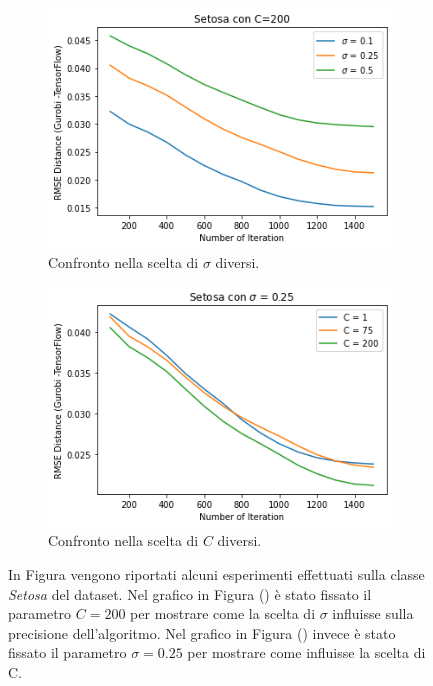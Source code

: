 \documentclass[a4paper,12pt]{report}
\begin{document}
\begin{figure}[H]
    \begin{subfigure}{0.47\textwidth}
        \centering
        \includegraphics[scale=0.5]{images/Grafici/Setosa_C200_sigmaDiversi.png}
        \caption{Confronto nella scelta di $\sigma$ diversi.}
        \label{subfig:Setosa_C200_sigmaDiversi}
    \end{subfigure}
    \begin{subfigure}{0.47\textwidth}
        \centering
        \includegraphics[scale=0.5]{images/Grafici/Setosa_Cdiversi_sigma025.png}
        \caption{Confronto nella scelta di $C$ diversi.}
        \label{subfig:Setosa_Cdiversi_sigma025}
    \end{subfigure}
    \caption{In Figura vengono riportati alcuni esperimenti effettuati sulla classe \textit{Setosa} del dataset. Nel grafico in Figura () è stato fissato il parametro $C=200$ per mostrare come la scelta di $\sigma$ influisse sulla precisione dell'algoritmo. Nel grafico in Figura () invece è stato fissato il parametro $\sigma = 0.25$ per mostrare come influisse la scelta di C.}
    \label{fig:Setosa_Preliminari}
\end{figure}
\end{document}
